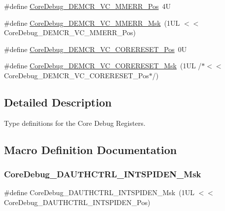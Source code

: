 \begin{DoxyCompactItemize}
\item 
\#define \mbox{\hyperlink{group___c_m_s_i_s___core_debug_ga444454f7c7748e76cd76c3809c887c41}{Core\+Debug\+\_\+\+D\+E\+M\+C\+R\+\_\+\+V\+C\+\_\+\+M\+M\+E\+R\+R\+\_\+\+Pos}}~4U
\item 
\#define \mbox{\hyperlink{group___c_m_s_i_s___core_debug_gad420a9b60620584faaca6289e83d3a87}{Core\+Debug\+\_\+\+D\+E\+M\+C\+R\+\_\+\+V\+C\+\_\+\+M\+M\+E\+R\+R\+\_\+\+Msk}}~(1\+U\+L $<$$<$ Core\+Debug\+\_\+\+D\+E\+M\+C\+R\+\_\+\+V\+C\+\_\+\+M\+M\+E\+R\+R\+\_\+\+Pos)
\item 
\#define \mbox{\hyperlink{group___c_m_s_i_s___core_debug_ga9fcf09666f7063a7303117aa32a85d5a}{Core\+Debug\+\_\+\+D\+E\+M\+C\+R\+\_\+\+V\+C\+\_\+\+C\+O\+R\+E\+R\+E\+S\+E\+T\+\_\+\+Pos}}~0U
\item 
\#define \mbox{\hyperlink{group___c_m_s_i_s___core_debug_ga906476e53c1e1487c30f3a1181df9e30}{Core\+Debug\+\_\+\+D\+E\+M\+C\+R\+\_\+\+V\+C\+\_\+\+C\+O\+R\+E\+R\+E\+S\+E\+T\+\_\+\+Msk}}~(1\+U\+L /$\ast$$<$$<$ Core\+Debug\+\_\+\+D\+E\+M\+C\+R\+\_\+\+V\+C\+\_\+\+C\+O\+R\+E\+R\+E\+S\+E\+T\+\_\+\+Pos$\ast$/)
\end{DoxyCompactItemize}


\subsection{Detailed Description}
Type definitions for the Core Debug Registers. 



\subsection{Macro Definition Documentation}
\mbox{\label{group___c_m_s_i_s___core_debug_ga1570f149a0f89f70fc2644a5842cbcb4}} 
\subsubsection{\texorpdfstring{Core\+Debug\+\_\+\+D\+A\+U\+T\+H\+C\+T\+R\+L\+\_\+\+I\+N\+T\+S\+P\+I\+D\+E\+N\+\_\+\+Msk}{CoreDebug\_DAUTHCTRL\_INTSPIDEN\_Msk}\hspace{0.1cm}{\footnotesize\ttfamily [1/2]}}
{\footnotesize\ttfamily \#define Core\+Debug\+\_\+\+D\+A\+U\+T\+H\+C\+T\+R\+L\+\_\+\+I\+N\+T\+S\+P\+I\+D\+E\+N\+\_\+\+Msk~(1\+U\+L $<$$<$ Core\+Debug\+\_\+\+D\+A\+U\+T\+H\+C\+T\+R\+L\+\_\+\+I\+N\+T\+S\+P\+I\+D\+E\+N\+\_\+\+Pos)}

